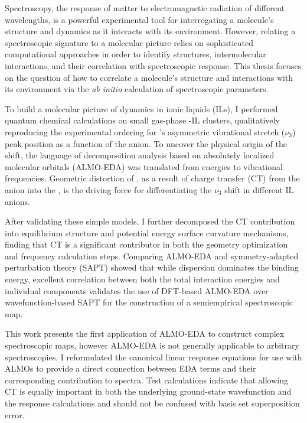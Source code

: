 \documentclass[%
  class = article,%
  crop = false,%
  float = true,%
  multi = true,%
  preview = false,%
]{standalone}
\begin{document}
\onlyifstandalone{\maketitle}
Spectroscopy, the response of matter to electromagnetic radiation of different wavelengths, is a powerful experimental tool for interrogating a molecule's structure and dynamics as it interacts with its environment. However, relating a spectroscopic signature to a molecular picture relies on sophisticated computational approaches in order to identify structures, intermolecular interactions, and their correlation with spectroscopic response. This thesis focuses on the question of how to correlate a molecule's structure and interactions with its environment via the \textit{ab initio} calculation of spectroscopic parameters.

To build a molecular picture of  dynamics in ionic liquids (ILs), I performed quantum chemical calculations on small gas-phase -IL clusters, qualitatively reproducing the experimental ordering for 's asymmetric vibrational stretch (\(\nu_3\)) peak position as a function of the anion. To uncover the physical origin of the shift, the language of decomposition analysis based on absolutely localized molecular orbitals (ALMO-EDA) was translated from energies to vibrational frequencies. Geometric distortion of , as a result of charge transfer (CT) from the anion into the , is the driving force for differentiating the  \(\nu_3\) shift in different IL anions.

After validating these simple models, I further decomposed the CT contribution into equilibrium structure and potential energy surface curvature mechanisms, finding that CT is a significant contributor in both the geometry optimization and frequency calculation steps. Comparing ALMO-EDA and symmetry-adapted perturbation theory (SAPT) showed that while dispersion dominates the binding energy, excellent correlation between both the total interaction energies and individual components validates the use of DFT-based ALMO-EDA over wavefunction-based SAPT for the construction of a semiempirical spectroscopic map.

This work presents the first application of ALMO-EDA to construct complex spectroscopic maps, however ALMO-EDA is not generally applicable to arbitrary spectroscopies. I reformulated the canonical linear response equations for use with ALMOs to provide a direct connection between EDA terms and their corresponding contribution to spectra. Test calculations indicate that allowing CT is equally important in both the underlying ground-state wavefunction and the response calculations and should not be confused with basis set superposition error.
\end{document}
